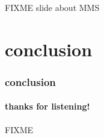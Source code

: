\documentclass[10pt,hyperref={pdfpagelabels=true}]{beamer}
\begin{document}
\begin{frame}{FIXME slide about MMS}
\end{frame}



\section*{conclusion}

\begin{frame}
  \frametitle{conclusion}
  \framesubtitle{thanks for listening!}

\begin{center}
FIXME
\end{center}

\end{frame}
\end{document}
